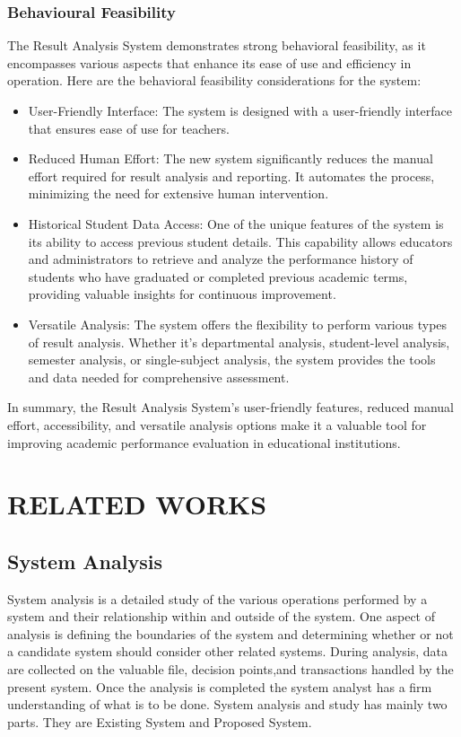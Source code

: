 \documentclass{nascproject}
\begin{document}
    \subsection{Behavioural Feasibility}
    The Result Analysis System demonstrates strong behavioral feasibility, as it encompasses various aspects that enhance its ease of use and efficiency in operation. Here are the behavioral feasibility considerations for the system:
    \begin{itemize}
    	\item User-Friendly Interface: The system is designed with a user-friendly interface that ensures ease of use for teachers.
    	\item Reduced Human Effort: The new system significantly reduces the manual effort required for result analysis and reporting. It automates the process, minimizing the need for extensive human intervention. 
    	\item Historical Student Data Access: One of the unique features of the system is its ability to access previous student details. This capability allows educators and administrators to retrieve and analyze the performance history of students who have graduated or completed previous academic terms, providing valuable insights for continuous improvement.
    	
    	\item Versatile Analysis: The system offers the flexibility to perform various types of result analysis. Whether it's departmental analysis, student-level analysis, semester analysis, or single-subject analysis, the system provides the tools and data needed for comprehensive assessment.
    \end{itemize}
    
    In summary, the Result Analysis System's user-friendly features, reduced manual effort, accessibility, and versatile analysis options make it a valuable tool for improving academic performance evaluation in educational institutions.
   
   
   

\chapter{RELATED WORKS}
\section{System Analysis}
System analysis is a detailed study of the various operations performed by a system
and their relationship within and outside of the system. One aspect of analysis is defining the
boundaries of the system and determining whether or not a candidate system should consider
other related systems. During analysis, data are collected on the valuable file, decision points,and transactions handled by the present system. Once the analysis is completed the system
analyst has a firm understanding of what is to be done. System analysis and study has mainly
two parts. They are Existing System and Proposed System.
\end{document}
